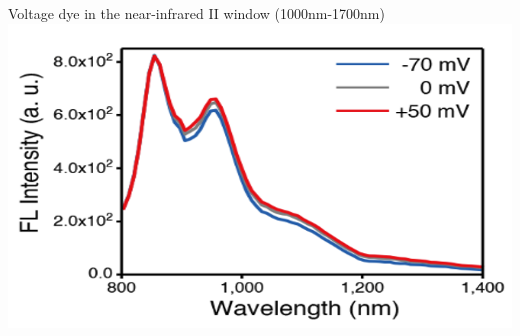 \begin{frame}{ Voltage dye in the near-infrared II window (1000nm-1700nm) }{ }
	\includegraphics[height=0.4\textheight,center]{media/Spectra.png}
\end{frame}{}


